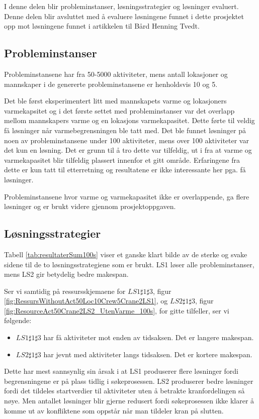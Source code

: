 I denne delen blir probleminstanser, løsningsstrategier og løsninger evaluert. Denne delen blir avsluttet med å evaluere løsningene funnet i dette prosjektet opp mot løsningene funnet i artikkelen til Bård Henning Tvedt.

\subsection{Probleminstanser}
Probleminstansene har fra 50-5000 aktiviteter, mens antall lokasjoner og mannskaper i de genererte probleminstansene er henholdsvis 10 og 5.

Det ble først eksperimentert litt med mannskapets varme og lokasjoners varmekapsitet og i det første settet med probleminstanser var det overlapp mellom mannskapers varme og en lokasjons varmekapasitet. Dette førte til veldig få løsninger når varmebegrensningen ble tatt med. Det ble funnet løsninger på noen av probleminstansene under 100 aktiviteter, mens over 100 aktiviteter var det kun en løsning. Det er grunn til å tro dette var tilfeldig, ut i fra at varme og varmekapasitet blir tilfeldig plassert innenfor et gitt område. Erfaringene fra dette er kun tatt til etterretning og resultatene er ikke interessante her pga. få løsninger.

Probleminstansene hvor varme og varmekapasitet ikke er overlappende, ga flere løsninger og er brukt videre gjennom prosjektoppgaven.

\subsection{Løsningsstrategier}
Tabell \ref{tab:resultaterSum100s} viser et ganske klart bilde av de sterke og svake sidene til de to løsningsstrategiene som er brukt. LS1 løser alle probleminstanser, mens LS2 gir betydelig bedre makespan.

Ser vi samtidig på ressursskjemaene for $LS1\sharp1\sharp3$, figur \ref{fig:RessursWithoutAct50Loc10Crew5Crane2LS1}, og $LS2\sharp1\sharp3$, figur \ref{fig:ResourceAct50Crane2LS2_UtenVarme_100s}, for gitte tilfeller, ser vi følgende:
\begin{itemize}
\item $LS1\sharp1\sharp3$ har få aktiviteter mot enden av tidsaksen. Det er langere makespan.
\item $LS2\sharp1\sharp3$ har jevnt med aktiviteter langs tidsaksen. Det er kortere makespan.
\end{itemize}
Dette har mest sannsynlig sin årsak i at LS1 produserer flere løsninger fordi begrensningene er på plass tidlig i søkeprosessen.
LS2 produserer bedre løsninger fordi det tildeles startverdier til aktiviteter uten å betrakte kranfordelingen så nøye. Men antallet løsninger blir gjerne redusert fordi søkeprosessen ikke klarer å komme ut av konfliktene som oppstår når man tildeler kran på slutten.

